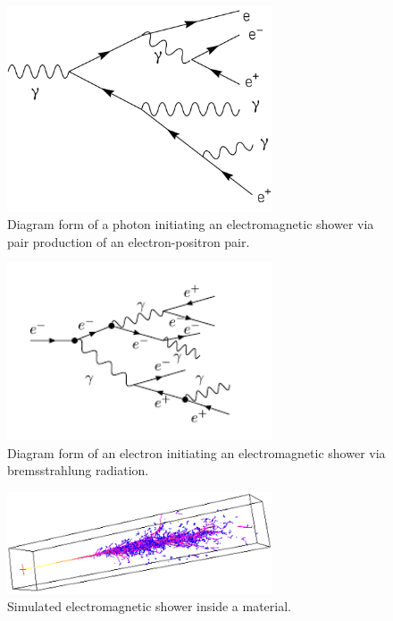 \begin{figure}[H]
    \centering
    \includegraphics[width=0.7\textwidth]{Images/ECAL/Introduction/Photon_Shower.png}    
    \caption{Diagram form of a photon initiating an electromagnetic shower via pair production of an electron-positron pair.}
    \label{fig:Photon_Shower}
\end{figure}

\begin{figure}[H]
    \centering
    \includegraphics[width=0.7\textwidth]{Images/ECAL/Introduction/Electron_Shower.png}    
    \caption{Diagram form of an electron initiating an electromagnetic shower via bremsstrahlung radiation.}
    \label{fig:Electron_Shower}
\end{figure}

\begin{figure}[H]
    \centering
    \includegraphics[width=0.7\textwidth]{Images/ECAL/Introduction/EM_Crystal_Shower.png}    
    \caption{Simulated electromagnetic shower inside a material.}
    \label{fig:Simulated_Shower}
\end{figure}

